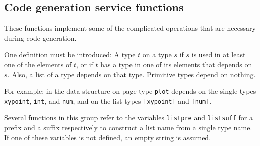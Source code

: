 \subsection{Code generation service functions}
These functions implement some of the complicated operations that
are necessary during code generation. 

One definition must be introduced:
A type $t$  on a type $s$ if $s$
is used in at least one of the elements of $t$,
or if $t$ has a type in one of its elements that depends on $s$.
Also,
a list of a type depends on that type.
Primitive types depend on nothing.

For example:
in the data structure on page \pageref{plotds} type \texttt{plot}
depends on the single types \texttt{xypoint}, \texttt{int}, and \texttt{num},
and on the list types \texttt{[xypoint]} and \texttt{[num]}.

Several functions in this group refer to the {\Tm} variables \verb+listpre+
and \verb+listsuff+ for a prefix and a suffix respectively to construct
a list name from a single type name.
If one of these variables is not defined, an empty string is assumed.

